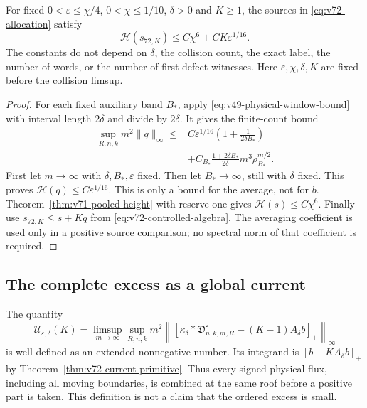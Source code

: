 \begin{theorem}
\label{thm:v72-global-recovery}
For fixed $0<\varepsilon\le\chi/4$, $0<\chi\le1/10$,
$\delta>0$ and $K\ge1$, the sources in
\eqref{eq:v72-allocation} satisfy
\begin{equation}\label{eq:v72-global-controlled-height}
 \mathcal H(s_{72,K})\le C\chi^6+CK\varepsilon^{1/16}.
\end{equation}
The constants do not depend on $\delta$, the collision count, the
exact label, the number of words, or the number of first-defect
witnesses. Here $\varepsilon,\chi,\delta,K$ are fixed before
the collision limsup.
\end{theorem}
\begin{proof}
For each fixed auxiliary band $B_*$, apply
\eqref{eq:v49-physical-window-bound} with interval length $2\delta$
and divide by $2\delta$. It gives the finite-count bound
\begin{equation}\label{eq:v72-finite-average-height}
 \begin{split}
 \sup_{R,n,k}m^2\|q\|_\infty
 \le{}&C\varepsilon^{1/16}\left(1+\frac1{2\delta B_*}\right)\\
 &+C_{B_*}\frac{1+2\delta B_*}{2\delta}
                            m^3\rho_{B_*}^{m/2}.
 \end{split}
\end{equation}
First let $m\to\infty$ with $\delta,B_*,\varepsilon$ fixed.
Then let $B_*\to\infty$, still with $\delta$ fixed. This proves
$\mathcal H(q)\le C\varepsilon^{1/16}$. This is only a bound
for the average, not for $b$. Theorem~\ref{thm:v71-pooled-height}
with reserve one gives $\mathcal H(s)\le C\chi^6$. Finally use
$s_{72,K}\le s+Kq$ from
\eqref{eq:v72-controlled-algebra}. The averaging coefficient is
used only in a positive source comparison; no spectral norm of that
coefficient is required.
\end{proof}

\subsection{The complete excess as a global current}
The quantity
\begin{equation}\label{eq:v72-complete-current-excess}
 \mathcal U_{\varepsilon,\delta}(K)
 =\limsup_{m\to\infty}\sup_{R,n,k}m^2
   \left\|\left[\kappa_\delta*\mathfrak D^\varepsilon_{n,k,m,R}
                        -(K-1)A_\delta b\right]_+\right\|_\infty
\end{equation}
is well-defined as an extended nonnegative number. Its integrand
is $[b-KA_\delta b]_+$ by
Theorem~\ref{thm:v72-current-primitive}. Thus every signed physical
flux, including all moving boundaries, is combined at the same roof
before a positive part is taken. This definition is not a claim that
the ordered excess is small.

